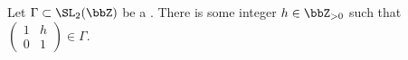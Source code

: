 \begin{lemma} \label{lemma:every_congruence_subgroup_of_SL_2_Z_has_a_translation_matrix}
    Let $\Gamma \subset \SL_2(\bbZ)$ be a . There is some integer $h \in \bbZ_{> 0}$ such that $\begin{pmatrix} 1 & h \\ 0 & 1 \end{pmatrix} \in \Gamma$.
\end{lemma}